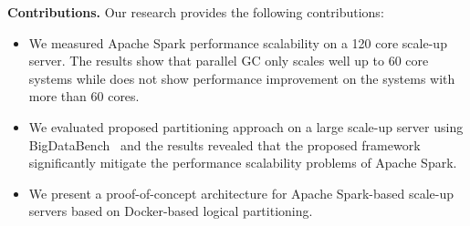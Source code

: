 
\textbf{Contributions.} Our research provides the following contributions:
\begin{itemize}
\item 
We measured Apache Spark performance scalability on a 120 core scale-up server.
The results show that parallel GC only scales well up to 60 core systems while
does not show performance improvement on the systems with more than 60 cores.
\item 
We evaluated proposed partitioning approach on a large scale-up server
using 
BigDataBench~\cite{wang2014bigdatabench} and
the results revealed that the proposed framework significantly mitigate the 
performance scalability problems of Apache Spark.
\item 
We present a proof-of-concept architecture for Apache Spark-based scale-up servers
based on Docker-based logical partitioning.
\end{itemize}


